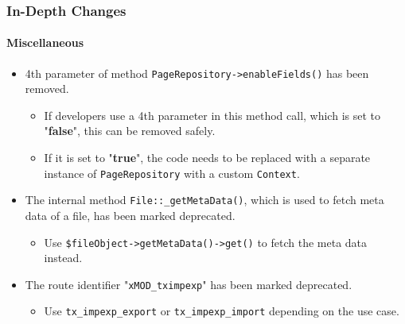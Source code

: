 
\begin{frame}[fragile]
	\frametitle{In-Depth Changes}
	\framesubtitle{Miscellaneous}

	\begin{itemize}

		\item 4th parameter of method \texttt{PageRepository->enableFields()} has been removed.

		\begin{itemize}\smaller
			\item[\ding{228}] If developers use a 4th parameter in this method call, which is set to "\textbf{false}", this can be removed safely.
			\item[\ding{228}] If it is set to "\textbf{true}", the code needs to be replaced with a separate instance of \texttt{PageRepository} with a custom \texttt{Context}.
		\end{itemize}\normalsize

		\item The internal method \texttt{File::\_getMetaData()}, which is used to fetch meta data of a file,
			has been marked deprecated.

			\begin{itemize}\smaller
				\item[\ding{228}] Use \texttt{\$fileObject->getMetaData()->get()} to fetch the meta data instead.
			\end{itemize}\normalsize

		\item The route identifier "\texttt{xMOD\_tximpexp}" has been marked deprecated.

			\begin{itemize}\smaller
				\item[\ding{228}] Use \texttt{tx\_impexp\_export} or \texttt{tx\_impexp\_import} depending on the use case.
			\end{itemize}\normalsize

	\end{itemize}

\end{frame}


